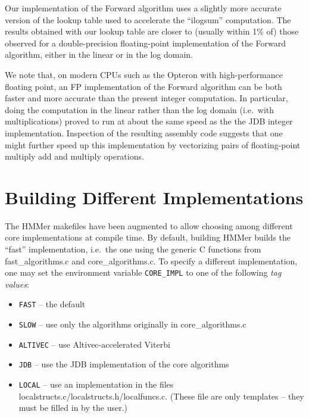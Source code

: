 \documentclass[letterpaper,10pt]{article}
\begin{document}
Our implementation of the Forward algorithm uses a slightly more
accurate version of the lookup table used to accelerate the
``ilogsum'' computation.  The results obtained with our lookup table
are closer to (usually within 1\% of) those observed for a
double-precision floating-point implementation of the Forward
algorithm, either in the linear or in the log domain.

We note that, on modern CPUs such as the Opteron with high-performance
floating point, an FP implementation of the Forward algorithm can be
both faster and more accurate than the present integer computation.
In particular, doing the computation in the linear rather than the log
domain (i.e.\ with multiplications) proved to run at about the same
speed as the the JDB integer implementation.  Inspection of the
resulting assembly code suggests that one might further speed up
this implementation by vectorizing pairs of floating-point multiply
add and multiply operations.

\section{Building Different Implementations}

The HMMer makefiles have been augmented to allow choosing among
different core implementations at compile time.  By default,
building HMMer builds the ``fast'' implementation, i.e.\ the
one using the generic C functions from fast\_algorithms.c
and core\_algorithms.c.  To specify a different implementation,
one may set the environment variable \texttt{CORE\_IMPL} to
one of the following \emph{tag values}:
\begin{itemize}
\item \texttt{FAST} -- the default

\item \texttt{SLOW} -- use only the algorithms originally in core\_algorithms.c

\item \texttt{ALTIVEC} -- use Altivec-accelerated Viterbi

\item \texttt{JDB} -- use the JDB implementation of the core algorithms

\item \texttt{LOCAL} -- use an implementation in the files localstructs.c/localstructs.h/localfuncs.c.  (These file are only templates -- they must be filled in by the user.)
\end{itemize}
\end{document}
